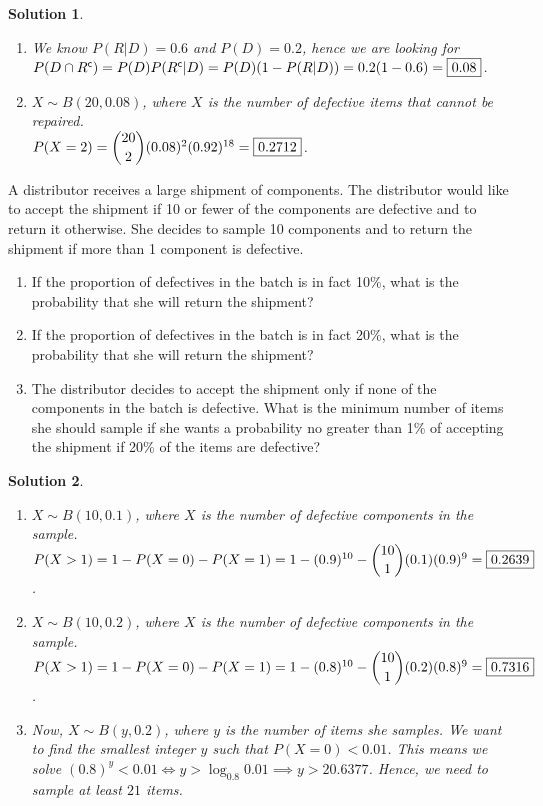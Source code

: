 \documentclass[11pt]{article}
\newtheorem*{solution}{Solution}
\theoremstyle{mystyle}
\begin{document}
\begin{solution}
    \leavevmode
    \begin{enumerate}[label=\alph*.]
        \item We know $P(R|D)=0.6$ and $P(D)=0.2$, hence we are looking for $P(D \cap R^{\mathsf{c}}) = P(D)P(R^{\mathsf{c}}|D) 
        = P(D)(1-P(R|D))= 0.2(1-0.6) = \boxed{0.08}$.
        \item $X \sim B(20,0.08)$, where $X$ is the number of defective items that cannot be repaired.
        \\ $P(X=2)=\dbinom{20}{2} (0.08)^2 (0.92)^{18} = \boxed{0.2712}$.
    \end{enumerate}
\end{solution}

\begin{psproblem}{}{}
    A distributor receives a large shipment of components. The distributor would like to accept the shipment if 10
    or fewer of the components are defective and to return it otherwise. She decides to sample 10 components and to
    return the shipment if more than 1 component is defective.
    \begin{enumerate}[label=\alph*.]
        \item If the proportion of defectives in the batch is in fact 10\%, what is the probability that she will return the
        shipment?
        \item If the proportion of defectives in the batch is in fact 20\%, what is the probability that she will return the
        shipment?
        \item The distributor decides to accept the shipment only if none of the components in the batch is defective. What
        is the minimum number of items she should sample if she wants a probability no greater than 1\% of accepting
        the shipment if 20\% of the items are defective?
    \end{enumerate}
\end{psproblem}

\begin{solution}
    \leavevmode
    \begin{enumerate}[label=\alph*.]
        \item $X \sim B(10,0.1)$, where $X$ is the number of defective components in the sample.
        \\ $P(X>1)=1-P(X=0)-P(X=1)=1-(0.9)^{10}-\dbinom{10}{1}(0.1)(0.9)^9 = \boxed{0.2639}$.
        \item $X \sim B(10,0.2)$, where $X$ is the number of defective components in the sample.
        \\ $P(X>1)=1-P(X=0)-P(X=1)=1-(0.8)^{10}-\dbinom{10}{1}(0.2)(0.8)^9 = \boxed{0.7316}$.
        \item Now, $X \sim B(y,0.2)$, where $y$ is the number of items she samples. We want to find
        the smallest integer $y$ such that $P(X=0) < 0.01$.
        This means we solve $(0.8)^y < 0.01 \iff y>\log_{0.8}0.01 \implies y>20.6377$.
        Hence, we need to sample at least $\boxed{21}$ items.
    \end{enumerate}
\end{solution}
\end{document}

